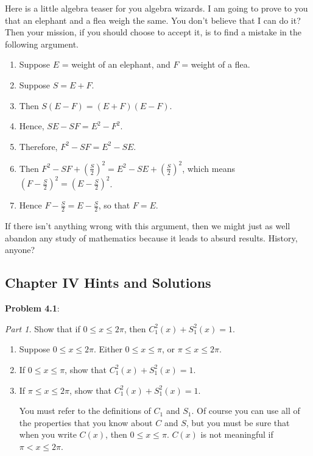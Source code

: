 \documentclass[english]{book}
\begin{document}
Here is a little algebra teaser for you algebra wizards. I am going to prove to you that an elephant and a flea weigh the same. You don't believe that I can do it? Then your mission, if you should choose to accept it, is to find a mistake in the following argument. 
\begin{enumerate}[\hspace{1cm}1)]
  \item Suppose $E$ = weight of an elephant, and $F$ = weight of a flea.
  \item Suppose $S = E + F$.
  \item Then $S(E - F) = (E + F) (E - F)$.
  \item Hence, $SE - SF = E^{2} - F^{2}$.
  \item Therefore, $F^{2} - SF = E^{2} - SE$.
  \item Then $F^{2} - SF + (\frac{S}{2})^{2} = E^{2} - SE + (\frac{S}{2})^{2}$, which means $(F-\frac{S}{2})^{2} = (E-\frac{S}{2})^{2}$.
  \item Hence $F - \frac{S}{2} = E - \frac{S}{2}$, so that $F = E$.
\end{enumerate}

If there isn't anything wrong with this argument, then we might just as well abandon any study of mathematics because it leads to absurd results. History, anyone?


\newpage
\begin{center}
\section*{Chapter IV Hints and Solutions}
\end{center}


\textbf{Problem 4.1}: 

\emph{Part 1.} Show that if $0 \leq x \leq 2\pi$, then $C_{1}^{2}(x)+S_{1}^{2}(x)=1$.
\begin{enumerate}[\hspace{1cm}1)]
  \item Suppose $0 \leq x \leq 2\pi$. Either $0 \leq x \leq \pi$, or $\pi \leq x \leq 2\pi$.
  \item If $0 \leq x \leq \pi$, show that $C_{1}^{2}(x) + S_{1}^{2}(x) = 1$.
  \item If $\pi \leq x \leq 2\pi$, show that $C_{1}^{2}(x) + S_{1}^{2}(x) = 1$.

        You must refer to the definitions of $C_{1}$ and $S_{1}$. Of course you can use all of the properties that you know about $C$ and $S$, but you must be sure that when you write $C(x)$, then $0 \leq x \leq \pi$. $C(x)$ is not meaningful if $\pi < x \leq 2 \pi$.
\end{enumerate}
\end{document}
